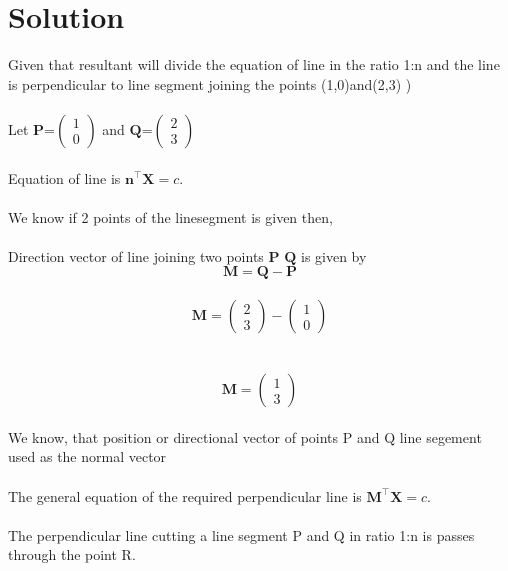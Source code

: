 \documentclass[journal,12pt,twocolumn]{article}
\newcommand{\myvec}[1]{\ensuremath{\begin{pmatrix}#1\end{pmatrix}}}
\let\vec\mathbf
\begin{document}
\section{Solution}

Given that resultant will divide the equation of line in the ratio 1:n and the line is perpendicular to line segment joining the points (1,0)and(2,3)  ) \\
\\
Let ${\vec{P}}$=$\myvec{
  1\\
  0}$
 and ${\vec{Q}}$=$\myvec{
  2\\
  3}$
\\
\\
Equation of line is ${\vec{n^{\top}}\vec{X}} = c$.
\\
\\
We know if 2 points of the linesegment is given then,\\
\\
Direction vector of line joining two points  ${\vec{P}}$ ${\vec{Q}}$ is given by\\

\begin{equation}
	\vec{M}=
     \vec{Q
 }-  \vec{P
 }
  \label{eq-2}
\end{equation}
\\

\begin{equation}
	\vec{M}=
     \myvec{
  2\\
  3
 }-  \myvec{
  1\\
  0
 }
  \label{eq-2}
\end{equation}
\\
\\
\begin{equation}
	\vec{M}=
     \myvec{
  1\\
  3
 }
   \label{eq-2}
\end{equation}
\\
We know, that position or  directional vector of points P and Q line segement used as the normal vector
\\
\\
 The general equation of the required perpendicular line is
 ${\vec{M^{\top}}\vec{X}} = c$.
 \\
 \\
 The perpendicular line cutting a line segment P and Q in ratio 1:n is passes through the point R.
 
\end{document}
